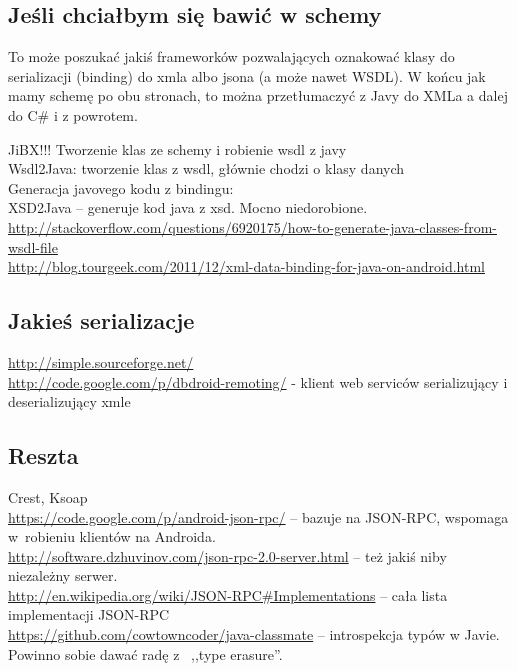 \subsection{Jeśli chciałbym się bawić w schemy}
To może poszukać jakiś frameworków pozwalających oznakować klasy do serializacji (binding) do xmla albo jsona (a może nawet WSDL).
W końcu jak mamy schemę po obu stronach, to można przetłumaczyć z Javy do XMLa a dalej do C\# i z powrotem.

JiBX!!! Tworzenie klas ze schemy i robienie wsdl z javy\\
Wsdl2Java: tworzenie klas z wsdl, głównie chodzi o klasy danych\\

Generacja javovego kodu z bindingu:\\
XSD2Java – generuje kod java z xsd. Mocno niedorobione.\\

\url{http://stackoverflow.com/questions/6920175/how-to-generate-java-classes-from-wsdl-file}\\
\url{http://blog.tourgeek.com/2011/12/xml-data-binding-for-java-on-android.html}\\

\subsection{Jakieś serializacje}
\url{http://simple.sourceforge.net/}\\
\url{http://code.google.com/p/dbdroid-remoting/} - klient web serviców serializujący i deserializujący xmle\\


\subsection{Reszta}
Crest, Ksoap \\
\url{https://code.google.com/p/android-json-rpc/} -- bazuje na JSON-RPC, wspomaga w~robieniu klientów na Androida.\\
\url{http://software.dzhuvinov.com/json-rpc-2.0-server.html} -- też jakiś niby niezależny serwer. \\ 
\url{http://en.wikipedia.org/wiki/JSON-RPC#Implementations} -- cała lista implementacji JSON-RPC \\
\url{https://github.com/cowtowncoder/java-classmate} -- introspekcja typów w Javie. Powinno sobie dawać radę z~ ,,type erasure''.





